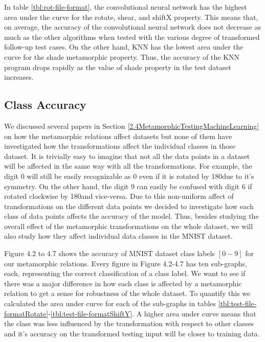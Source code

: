     In table \ref{tbl:rot-file-format}, the convolutional neural network has the highest area under the curve for the rotate, shear, and shiftX property. This means that, on average, the accuracy of the convolutional neural network does not decrease as much as the other algorithms when tested with the various degree of transformed follow-up test cases.
    On the other hand, KNN has the lowest area under the curve for the shade metamorphic property. Thus, the accuracy of the KNN program drops rapidly as the value of shade property in the test dataset increases.
    

\subsection{Class Accuracy}\label{Digit-by Accuracy}
    We discussed several papers in Section \ref{2.4MetamorphicTestingMachineLearning} on how the metamorphic relations affect datasets but none of them have investigated how the transformations affect the individual classes in those dataset. It is trivially easy to imagine that not all the data points in a dataset will be affected in the same way with all the transformations. For example, the digit $0$ will still be easily recognizable as $0$ even if it is rotated by 180\textdegree  due to it's symmetry. On the other hand, the digit $9$ can easily be confused with digit $6$ if rotated clockwise by 180\textdegree and vice-versa. Due to this non-uniform affect of transformations on the different data points we decided to investigate how each class of data points affects the accuracy of the model. Thus, besides studying the overall effect of the metamorphic transformations on the whole dataset, we will also study how they affect individual data classes in the MNIST dataset. 
    
    Figure 4.2 to 4.7 shows the accuracy of MNIST dataset class labels $[0-9]$ for our metamorphic relations. Every figure in Figure 4.2-4.7 has ten sub-graphs, each, representing the correct classification of a class label. We want to see if there was a major difference in how each class is affected by a metamorphic relation to get a sense for robustness of the whole dataset. To quantify this we calculated the area under curve for each of the sub-graphs in tables \ref{tbl:test-file-formatRotate}-\ref{tbl:test-file-formatShiftY}. A higher area under curve means that the class was less influenced by the transformation with respect to other classes and it's accuracy on the transformed testing input will be closer to training data.
    
